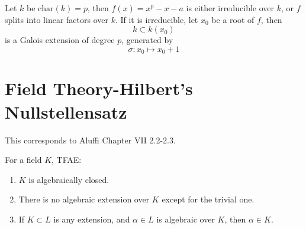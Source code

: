 \documentclass[openany]{book}
\begin{document}
\begin{prop}
    Let $k$ be $\text{char}(k)=p$, then $f(x)=x^p-x-a$ is either irreducible over $k$, or $f$ splits into linear factors over $k$. If it is irreducible, let $x_0$ be a root of $f$, then 
    \begin{equation*}
        k\subset k(x_0)
    \end{equation*}
    is a Galois extension of degree $p$, generated by 
    \begin{equation*}
        \sigma: x_0\mapsto x_0+1
    \end{equation*}
\end{prop}



















































\chapter{Field Theory-Hilbert's Nullstellensatz}
This corresponds to Aluffi Chapter VII 2.2-2.3.


\begin{prop}
    For a field $K$, TFAE:
    \begin{enumerate}
        \item $K$ is algebraically closed.
        \item There is no algebraic extension over $K$ except for the trivial one.
        \item If $K\subset L$ is any extension, and $\alpha\in L$ is algebraic over $K$, then $\alpha\in K$.
    \end{enumerate}
\end{prop}
\end{document}

